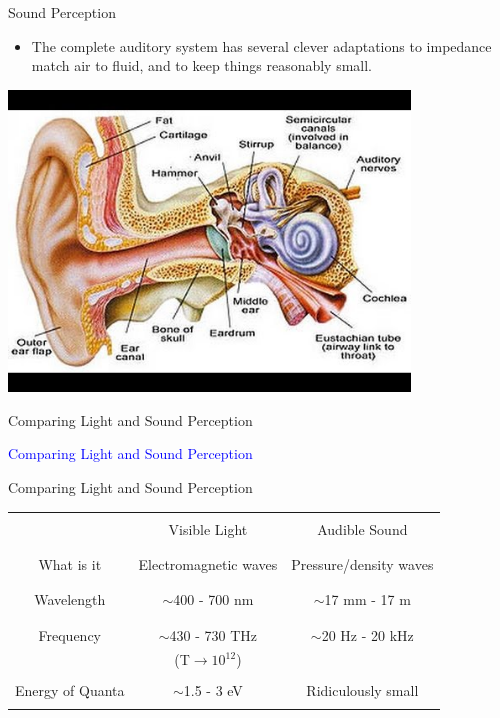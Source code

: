 \documentclass{beamer}
\begin{document}
\begin{frame}{Sound Perception}
   \begin{itemize}
      \item The complete auditory system has several clever adaptations to impedance match air to fluid, and to keep things reasonably small.
   \end{itemize}
   \begin{center}
      \includegraphics[width=0.8\textwidth]{figures/ear.jpg}
   \end{center}
\end{frame}

\begin{frame}{Comparing Light and Sound Perception}
   \begin{center}
      \Huge \textcolor{blue}{Comparing Light and Sound Perception}
   \end{center}
\end{frame}

\begin{frame}{Comparing Light and Sound Perception}
   \begin{center}
      \begin{tabular}{|c|c|c|}
         \hline
         & & \\
          & Visible Light & Audible Sound \\
         & & \\ \hline
         & & \\
         What is it & Electromagnetic waves & Pressure/density waves \\
         & & \\ \hline
         & & \\
         Wavelength & $\sim$400 - 700 nm & $\sim$17 mm - 17 m  \\
         & & \\ \hline
         & & \\
         Frequency & $\sim$430 - 730 THz & $\sim$20 Hz - 20 kHz  \\
         & (T$\rightarrow 10^{12}$) & \\ \hline
         & & \\
         Energy of Quanta & $\sim$1.5 - 3 eV & Ridiculously small  \\
         & & \\ \hline
      \end{tabular}
   \end{center}
\end{frame}
\end{document}

